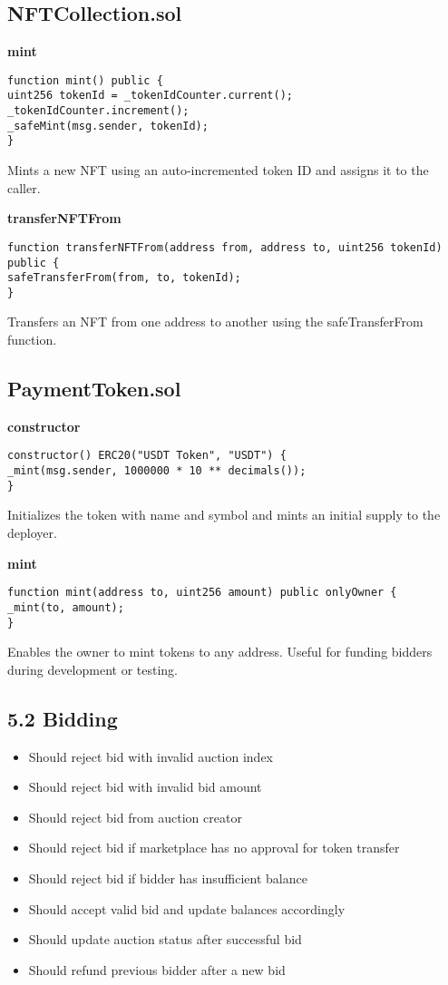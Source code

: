 \documentclass{article}
\begin{document}
\subsection{NFTCollection.sol}

\textbf{mint}
\begin{lstlisting}[language=Solidity]
function mint() public {
uint256 tokenId = _tokenIdCounter.current();
_tokenIdCounter.increment();
_safeMint(msg.sender, tokenId);
}
\end{lstlisting}
Mints a new NFT using an auto-incremented token ID and assigns it to the caller.

\textbf{transferNFTFrom}
\begin{lstlisting}[language=Solidity]
function transferNFTFrom(address from, address to, uint256 tokenId) public {
safeTransferFrom(from, to, tokenId);
}
\end{lstlisting}
Transfers an NFT from one address to another using the safeTransferFrom function.

\subsection{PaymentToken.sol}

\textbf{constructor}
\begin{lstlisting}[language=Solidity]
constructor() ERC20("USDT Token", "USDT") {
_mint(msg.sender, 1000000 * 10 ** decimals());
}
\end{lstlisting}
Initializes the token with name and symbol and mints an initial supply to the deployer.

\textbf{mint}
\begin{lstlisting}[language=Solidity]
function mint(address to, uint256 amount) public onlyOwner {
_mint(to, amount);
}
\end{lstlisting}
Enables the owner to mint tokens to any address. Useful for funding bidders during development or testing.

\subsection*{5.2 Bidding}
\begin{itemize}
  \item Should reject bid with invalid auction index
  \item Should reject bid with invalid bid amount
  \item Should reject bid from auction creator
  \item Should reject bid if marketplace has no approval for token transfer
  \item Should reject bid if bidder has insufficient balance
  \item Should accept valid bid and update balances accordingly
  \item Should update auction status after successful bid
  \item Should refund previous bidder after a new bid
\end{itemize}
\end{document}
